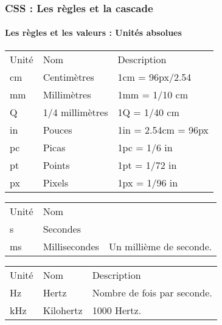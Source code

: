 \documentclass[xcolor=table]{beamer}
\begin{document}
\begin{frame}[fragile]
\frametitle{CSS : Les règles et la cascade}
\framesubtitle{Les règles et les valeurs : Unités absolues}

\scriptsize\bfseries
{}
\begin{minipage}{0.50\textwidth} 
\begin{center}
	\begin{tabular}{lll}
		\rowcolor{darkblue}
		\color{white}Unité & \color{white}Nom & \color{white}Description \\
		cm & Centimètres & 1cm = 96px/2.54\\
		mm & Millimètres & 1mm = 1/10 cm\\
		Q & 1/4 millimètres & 1Q = 1/40 cm\\
		in & Pouces & 1in = 2.54cm = 96px\\
		pc & Picas & 1pc = 1/6 in\\
		pt & Points & 1pt = 1/72 in\\
		px & Pixels & 1px = 1/96 in\\
	\end{tabular}
\end{center}
\end{minipage}
%
\begin{minipage}{0.49\textwidth}
	\begin{center}
		\begin{tabular}{llp{}}
			\rowcolor{darkblue}
			
			\color{white}Unité & \color{white}Nom & \textcolor{white}{Description} \\
			s & Secondes &  \\
			ms & Millisecondes & Un millième de seconde.\\
		\end{tabular}
	\end{center}
	\begin{center}
		\begin{tabular}{llp{}}
			\rowcolor{darkblue}
			\color{white}Unité & \color{white}Nom & \color{white}Description \\
			Hz & Hertz & Nombre de fois par seconde.\\
			kHz & Kilohertz & 1000 Hertz.\\
		\end{tabular}
	\end{center}
\end{minipage}


\end{frame}
\end{document}
